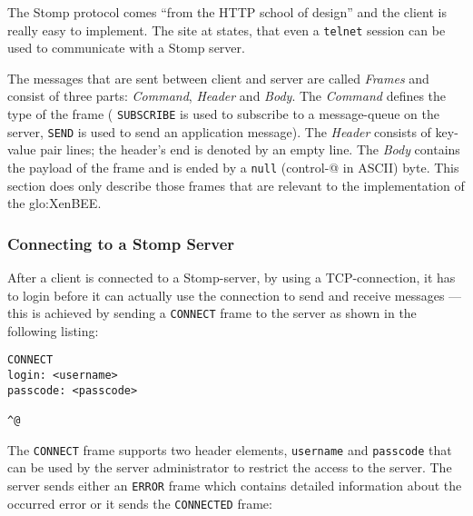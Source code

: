 The Stomp protocol comes ``from the HTTP school of design'' and the client
is really easy to implement. The  site at \cite{stomp} states, that even a
\texttt{telnet} session can be used to communicate with a Stomp server.

The  messages  that  are  sent   between  client  and  server  are  called
\emph{Frames}  and consist of  three parts:  \emph{Command}, \emph{Header}
and \emph{Body}.   The \emph{Command} defines  the type of the  frame (\eg
\texttt{SUBSCRIBE} is used to subscribe  to a message-queue on the server,
\texttt{SEND} is  used to send an application  message). The \emph{Header}
consists of key-value pair lines; the  header's end is denoted by an empty
line. The \emph{Body} contains the payload  of the frame and is ended by a
\texttt{null} (control-@  in ASCII) byte. This section  does only describe
those   frames  that   are   relevant  to   the   implementation  of   the
\gls{glo:XenBEE}.

\subsubsection{Connecting to a Stomp Server}

After  a  client   is  connected  to  a  Stomp-server,   \eg  by  using  a
TCP-connection, it has to login  before it can actually use the connection
to  send  and  receive  messages   ---  this  is  achieved  by  sending  a
\texttt{CONNECT} frame to the server as shown in the following listing:

\medskip
\begin{center}
  \begin{minipage}{.75\textwidth}
    \begin{lstlisting}[captionpos=b,backgroundcolor=\color{listingcolor},frame=lines,numbers=none,stepnumber=5,numberfirstline=false,numberstyle=\tiny,caption={The initial
      \texttt{CONNECT} message sent by a Stomp client.},label={lst:stomp-connect}]
CONNECT
login: <username>
passcode: <passcode>

^@
    \end{lstlisting}
  \end{minipage}
\end{center}

The \texttt{CONNECT} frame supports two header elements, \texttt{username}
and  \texttt{passcode} that  can be  used by  the server  administrator to
restrict  the   access  to  the   server.  The  server  sends   either  an
\texttt{ERROR}  frame  which   contains  detailed  information  about  the
occurred error or it sends the \texttt{CONNECTED} frame:

